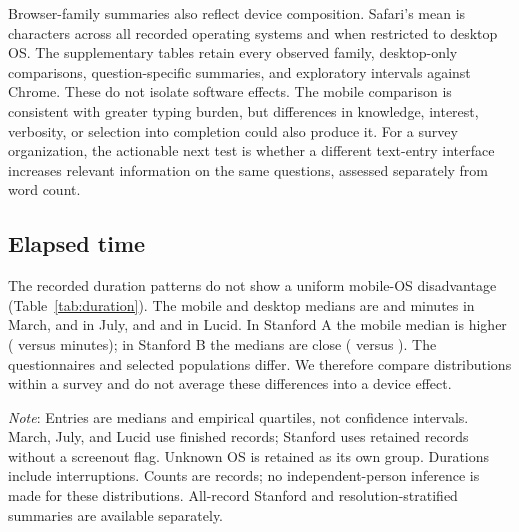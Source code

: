 \documentclass[11pt]{article}
\begin{document}
Browser-family summaries also reflect device composition. Safari's mean is \SafariTextMean{} characters across all recorded operating systems and \SafariDesktopTextMean{} when restricted to desktop OS. The supplementary tables retain every observed family, desktop-only comparisons, question-specific summaries, and exploratory intervals against Chrome. These do not isolate software effects. The mobile comparison is consistent with greater typing burden, but differences in knowledge, interest, verbosity, or selection into completion could also produce it. For a survey organization, the actionable next test is whether a different text-entry interface increases relevant information on the same questions, assessed separately from word count.

\subsection{Elapsed time}

The recorded duration patterns do not show a uniform mobile-OS disadvantage (Table~\ref{tab:duration}). The mobile and desktop medians are \MarchMobileMinutes{} and \MarchDesktopMinutes{} minutes in March, \JulyMobileMinutes{} and \JulyDesktopMinutes{} in July, and \LucidMobileMinutes{} and \LucidDesktopMinutes{} in Lucid. In Stanford A the mobile median is higher (\StanfordAMobileMinutes{} versus \StanfordADesktopMinutes{} minutes); in Stanford B the medians are close (\StanfordBMobileMinutes{} versus \StanfordBDesktopMinutes{}). The questionnaires and selected populations differ. We therefore compare distributions within a survey and do not average these differences into a device effect.

\begin{table}[htbp]
\centering
\caption{Elapsed minutes by recorded operating-system group.}
\label{tab:duration}
\small

\par\smallskip
\begin{minipage}{\linewidth}\footnotesize
\emph{Note}: Entries are medians and empirical quartiles, not confidence intervals. March, July, and Lucid use finished records; Stanford uses retained records without a screenout flag. Unknown OS is retained as its own group. Durations include interruptions. Counts are records; no independent-person inference is made for these distributions. All-record Stanford and resolution-stratified summaries are available separately.
\end{minipage}
\end{table}
\end{document}
